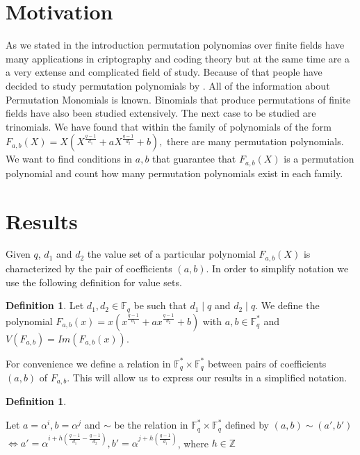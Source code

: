 \documentclass{article}
\theoremstyle{definition}
\newtheorem{definition}[theorem]{Definition}
\theoremstyle{remark}
\numberwithin{equation}{section}
\begin{document}
\section{Motivation}    

As we stated in the introduction permutation polynomias over finite fields have many applications in criptography and coding theory but at the same time are a a very extense and complicated field of study. Because of that people have decided to study permutation polynomials by . All of the information about Permutation Monomials is known. Binomials that produce permutations of finite fields have also been studied extensively. The next case to be studied are trinomials. We have found that within the family of polynomials of the form $F_{a,b}(X) =X\left(X^{\frac{q-1}{d_1}} + a X^{\frac{q-1}{d_2}} + b \right),$ there are many permutation polynomials. We want to find conditions in $a,b$ that guarantee that $F_{a,b}(X)$ is a permutation polynomial and count how many permutation polynomials exist in each family.

\section{Results}

Given $q$, $d_1$ and $d_2$ the value set of a particular polynomial $F_{a,b}(X)$ is characterized by the pair of coefficients $(a,b)$. In order to simplify notation we use the following definition for value sets.

\begin{definition}
  Let $d_1, d_2 \in \mathbb{F}_q$ be such that $d_1 \mid q$ and $d_2 \mid q$. We define the polynomial $F_{a,b}(x) = x(x^{\frac{q-1}{d_1}} + ax^{\frac{q-1}{d_2}} +b)$ with $a,b \in \mathbb{F}_q^{*}$ and $V(F_{a,b}) = Im(F_{a,b}(x))$.
\end{definition}

For convenience we define a relation in $\mathbb{F}_q^* \times \mathbb{F}_q^*$ between pairs of coefficients $(a,b)$ of $F_{a,b}$. This will allow us to express our results in a simplified notation.

\begin{definition}\label{relacion}

  Let $a = \alpha^i, b = \alpha^j$ and $\sim$ be the relation in $\mathbb{F}_q^* \times \mathbb{F}_q^*$ defined by $(a,b) \sim (a', b')$ 
  $\Longleftrightarrow a' = \alpha^{i+h(\frac{q-1}{d_1} - \frac{q-1}{d_2})}, b' = \alpha^{j+h(\frac{q-1}{d_1})}$, where $h \in \mathbb{Z}$

\end{definition}
\end{document}
